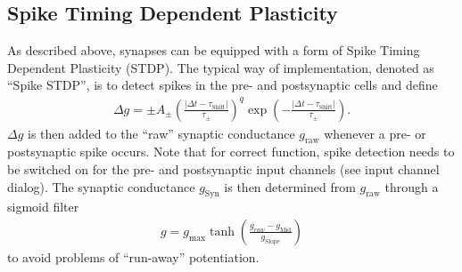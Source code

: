 \documentclass{article}
\begin{document}
\subsection{Spike Timing Dependent Plasticity}
As described above, synapses can be equipped with a form of Spike
Timing Dependent Plasticity (STDP).
The typical way of implementation, denoted as ``Spike STDP'',
is to detect spikes in the pre- and postsynaptic cells and 
define 
  \begin{align}
    \Delta g= \pm A_{\pm} \left(\frac{|\Delta t -
      \tau_{\text{Shift}}|}{\tau_{\pm}}\right)^q
    \exp\left(-\frac{|\Delta t -
      \tau_{\text{Shift}}|}{\tau_{\pm}}\right) .
  \end{align}
$\Delta g$ is then added to the ``raw'' synaptic conductance
$g_{\text{raw}}$ whenever a pre- or postsynaptic spike occurs. Note
that for correct function, spike detection needs to be switched on
for the pre- and postsynaptic input channels (see input channel
dialog). The synaptic conductance $g_{\text{Syn}}$ is then
determined from $g_{\text{raw}}$ through a sigmoid filter
\begin{align}
  g= g_{\text{max}} \tanh\left(\frac{g_{raw} -
    g_{\text{Mid}}}{g_{\text{Slope}}}\right) 
\end{align}
to avoid problems of ``run-away'' potentiation.
\end{document}
